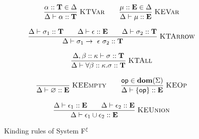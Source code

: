 \begin{figure}[p]
    \small
    \noindent\fbox{$\Delta \vdash \theta :: \kappa$}

    \medskip
    \begin{gather*}
        \frac{\alpha :: \mathbf{T} \in \Delta}
             {\Delta \vdash \alpha :: \mathbf{T}}
             \;\textsc{KTVar}
        \qquad
        \frac{\mu :: \mathbf{E} \in \Delta}
             {\Delta \vdash \mu :: \mathbf{E}}
             \;\textsc{KEVar}
        \\[8pt]
        \frac{\Delta \vdash \sigma_1 :: \mathbf{T}
              \qquad \Delta \vdash \epsilon :: \mathbf{E}
              \qquad \Delta \vdash \sigma_2 :: \mathbf{T}}
             {\Delta \vdash
              \sigma_1 \rightarrow~\epsilon~\sigma_2 :: \mathbf{T}}
             \;\textsc{KTArrow}
        \\[8pt]
        \frac{\Delta,\beta :: \kappa \vdash \sigma :: \mathbf{T}}
             {\Delta \vdash \forall\beta :: \kappa.\sigma :: \mathbf{T}}
             \;\textsc{KTAll}
        \\[8pt]
        \frac{}{\Delta\vdash\varnothing::\mathbf{E}}
             \;\textsc{KEEmpty}
        \qquad
        \frac{\mathsf{op}\in\mathbf{dom}(\Sigma)}
             {\Delta\vdash\{\mathsf{op}\}::\mathbf{E}}
             \;\textsc{KEOp}
        \\[8pt]
        \frac{\Delta\vdash\epsilon_1::\mathbf{E}
              \qquad\Delta\vdash\epsilon_2::\mathbf{E}}
             {\Delta\vdash\epsilon_1\cup\epsilon_2::\mathbf{E}}
             \;\textsc{KEUnion}
    \end{gather*}

    \caption{Kinding rules of System F$^{\xi}$}
    \label{systemf:kinding-rules}
\end{figure}
